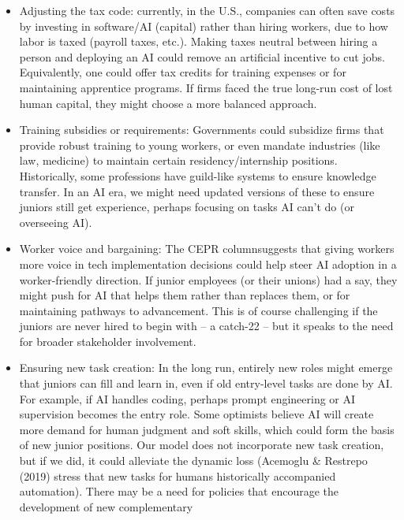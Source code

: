 \documentclass[12pt]{article}
\begin{document}
\begin{itemize}
  \begin{itemize}
  
  \item
    Adjusting the {tax code}: currently, in the U.S., companies
    can often save costs by investing in software/AI (capital) rather
    than hiring workers, due to how labor is taxed (payroll taxes,
    etc.). Making taxes neutral between hiring a person and deploying an
    AI could remove an artificial incentive to cut jobs. Equivalently,
    one could offer tax credits for training expenses or for maintaining
    apprentice programs. If firms faced the true long-run cost of lost
    human capital, they might choose a more balanced approach.
  \item
    {Training subsidies or requirements}: Governments could
    subsidize firms that provide robust training to young workers, or
    even mandate industries (like law, medicine) to maintain certain
    residency/internship positions. Historically, some professions have
    {guild-like systems} to ensure knowledge transfer. In an AI
    era, we might need updated versions of these to ensure juniors still
    get experience, perhaps focusing on tasks AI can't do (or overseeing
    AI).
  \item
    {Worker voice and bargaining}: The CEPR columnsuggests that
    giving workers more voice in tech implementation decisions could
    help steer AI adoption in a worker-friendly direction. If junior
    employees (or their unions) had a say, they might push for AI that
    {helps them} rather than replaces them, or for maintaining
    pathways to advancement. This is of course challenging if the
    juniors are never hired to begin with -- a catch-22 -- but it speaks
    to the need for broader stakeholder involvement.
  \item
    {Ensuring new task creation}: In the long run, entirely new
    roles might emerge that juniors can fill and learn in, even if old
    entry-level tasks are done by AI. For example, if AI handles coding,
    perhaps {prompt engineering} or {AI supervision} becomes
    the entry role. Some optimists believe AI will create more demand
    for human judgment and soft skills, which could form the basis of
    new junior positions. Our model does not incorporate new task
    creation, but if we did, it could alleviate the dynamic loss
    (Acemoglu \& Restrepo (2019) stress that new tasks for humans
    historically accompanied automation). There may be a need for
    {policies that encourage the development of new complementary
}
\end{itemize}
\end{itemize}
\end{document}
